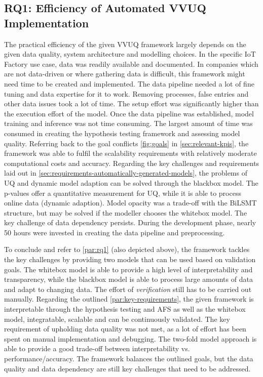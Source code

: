 \subsection{RQ1: Efficiency of Automated VVUQ Implementation}
\label{sec:discussion_rq1}
The practical efficiency of the given VVUQ framework largely depends on the given data quality, system architecture and modelling choices. In the specific IoT Factory use case, data was readily available and documented. In companies which are not data-driven or where gathering data is difficult, this framework might need time to be created and implemented. The data pipeline needed a lot of fine tuning and data expertise for it to work. Removing processes, false entries and other data issues took a lot of time. The setup effort was significantly higher than the execution effort of the model. Once the data pipeline was established, model training and inference was not time consuming. The largest amount of time was consumed in creating the hypothesis testing framework and assessing model quality. Referring back to the goal conflicts \autoref{fig:goals} in \autoref{sec:relevant-kpis}, the framework was able to fulfil the scalability requirements with relatively moderate computational costs and accuracy. Regarding the key challenges and requirements laid out in \autoref{sec:requirements-automatically-generated-models}, the problems of UQ and dynamic model adaption can be solved through the blackbox model. The p-values offer a quantitative measurement for UQ, while it is able to process online data (dynamic adaption). Model opacity was a trade-off with the BiLSMT structure, but may be solved if the modeller chooses the whitebox model. The key challenge of data dependency persists. During the development phase, nearly 50 hours were invested in creating the data pipeline and preprocessing.

To conclude and refer to \autoref{par:rq1} (also depicted above), the framework tackles the key challenges by providing two models that can be used based on validation goals. The whitebox model is able to provide a high level of interpretability and transparency, while the blackbox model is able to process large amounts of data and adapt to changing data. The effort of \textit{verification} still has to be carried out manually. Regarding the outlined \autoref{par:key-requirements}, the given framework is interpretable through the hypothesis testing and AFS as well as the whitebox model, integratable, scalable and can be continuously validated. The key requirement of upholding data quality was not met, as a lot of effort has been spent on manual implementation and debugging. The two-fold model approach is able to provide a good trade-off between interpretability vs. performance/accuracy. The framework balances the outlined goals, but the data quality and data dependency are still key challenges that need to be addressed.

